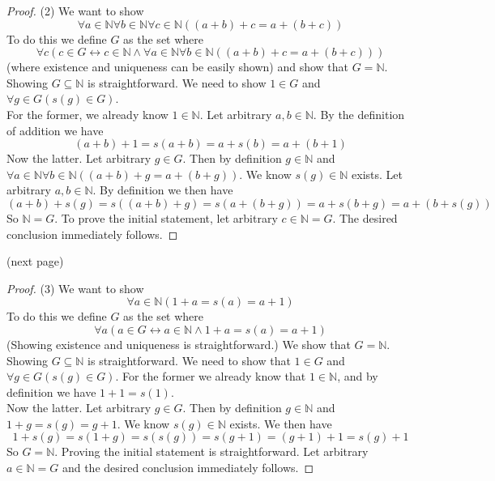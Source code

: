 \documentclass{report}
\begin{document}
\begin{proof}(2) We want to show
\begin{equation*}
\forall a\in\mathbb N\forall b\in\mathbb N\forall c\in\mathbb N((a+b)+c=a+(b+c)) 
\end{equation*}
To do this we define $G$ as the set where
\begin{equation*}
\forall c(c\in G\leftrightarrow c\in\mathbb N\land\forall a\in\mathbb N\forall b\in\mathbb N((a+b)+c=a+(b+c)))
\end{equation*}
(where existence and uniqueness can be easily shown) and show that $G=\mathbb N$.
Showing $G\subseteq\mathbb N$ is straightforward. We need to show $1\in G$ and $\forall g\in G(s(g)\in G)$.\\
\indent For the former, we already know $1\in\mathbb N$. Let arbitrary $a,b\in\mathbb N$. By the definition of addition we have
\begin{equation*}
(a+b)+1=s(a+b)=a+s(b)=a+(b+1)
\end{equation*}
\indent Now the latter. Let arbitrary $g\in G$. Then by definition $g\in\mathbb N$ and $\forall a\in\mathbb N\forall b\in\mathbb N((a+b)+g=a+(b+g))$. We know $s(g)\in\mathbb N$ exists. 
Let arbitrary $a,b\in\mathbb N$. By definition we then have
\begin{equation*}
(a+b)+s(g)=s((a+b)+g)=s(a+(b+g))=a+s(b+g)=a+(b+s(g))
\end{equation*}
So $\mathbb N=G$. To prove the initial statement, let arbitrary $c\in\mathbb N=G$. The desired conclusion immediately follows.
\end{proof}
\noindent(next page)\newpage
\begin{proof}(3)
We want to show
\begin{equation*}
\forall a\in\mathbb N(1+a=s(a)=a+1)
\end{equation*}
To do this we define $G$ as the set where
\begin{equation*}
\forall a(a\in G\leftrightarrow a\in\mathbb N\land 1+a=s(a)=a+1)
\end{equation*}
(Showing existence and uniqueness is straightforward.) We show that $G=\mathbb N$.
Showing $G\subseteq\mathbb N$ is straightforward. We need to show that $1\in G$ and $\forall g\in G(s(g)\in G)$. For the former we already know that $1\in\mathbb N$, and by definition we have
$1+1=s(1)$.\\
\indent Now the latter. Let arbitrary $g\in G$. Then by definition $g\in\mathbb N$ and $1+g=s(g)=g+1$. We know $s(g)\in\mathbb N$ exists. We then have
\begin{equation*}
1+s(g)=s(1+g)=s(s(g))=s(g+1)=(g+1)+1=s(g)+1
\end{equation*}
So $G=\mathbb N$. Proving the initial statement is straightforward. Let arbitrary $a\in\mathbb N=G$ and the desired conclusion immediately follows.
\end{proof}
\end{document}
